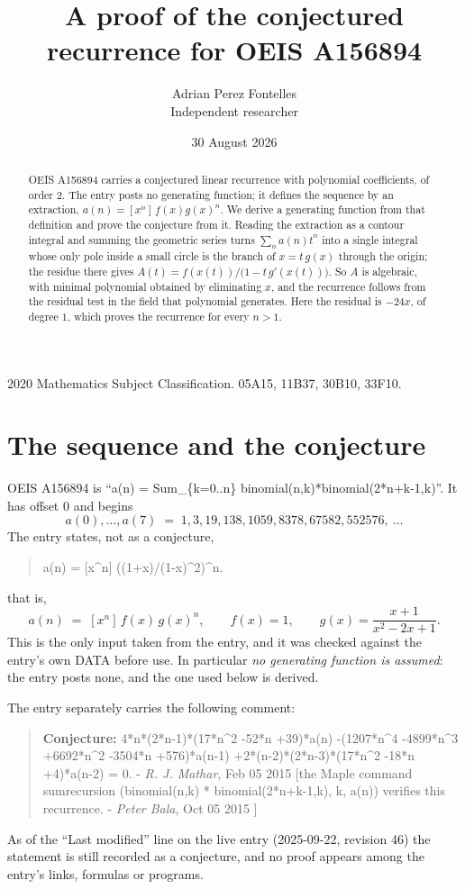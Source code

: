 \documentclass[11pt,a4paper]{article}
\title{A proof of the conjectured recurrence for OEIS A156894}
\author{Adrian Perez Fontelles\\ \small Independent researcher}
\date{30 August 2026}
\theoremstyle{plain}
\theoremstyle{definition}
\begin{document}
\maketitle

\begin{abstract}
OEIS A156894 carries a conjectured linear recurrence with polynomial coefficients, of
order 2. The entry posts no generating function; it defines the sequence by an
extraction, $a(n)=[x^{n}]\,f(x)g(x)^{n}$. We derive a generating function from that
definition and prove the conjecture from it. Reading the extraction as a contour integral
and summing the geometric series turns $\sum_{n}a(n)t^{n}$ into a single integral whose
only pole inside a small circle is the branch of $x=t\,g(x)$ through the origin; the
residue there gives $A(t)=f(x(t))/\bigl(1-t\,g'(x(t))\bigr)$. So $A$ is algebraic, with
minimal polynomial obtained by eliminating $x$, and the recurrence follows from the
residual test in the field that polynomial generates. Here the residual is
$- 24 x$, of degree $1$, which proves the recurrence for every $n>1$.
\end{abstract}

\noindent\small 2020 Mathematics Subject Classification. 05A15, 11B37, 30B10, 33F10.\normalsize

\section{The sequence and the conjecture}

OEIS A156894 is ``a(n) = Sum\_\{k=0..n\} binomial(n,k)*binomial(2*n+k-1,k)''. It has offset $0$ and begins
\[
a(0),\dots,a(7)\;=\;1, 3, 19, 138, 1059, 8378, 67582, 552576,\ \dots
\]
The entry states, not as a conjecture,
\begin{quote}\small
a(n) = [x\^{}n] ((1+x)/(1-x)\^{}2)\^{}n.
\end{quote}
that is,
\begin{equation}\label{eq:def}
a(n)\;=\;[x^{n}]\,f(x)\,g(x)^{n},
\qquad f(x)=1,\qquad g(x)=\frac{x + 1}{x^{2} - 2 x + 1} .
\end{equation}
This is the only input taken from the entry, and it was checked against the entry's own
DATA before use. In particular \emph{no generating function is assumed}: the entry posts
none, and the one used below is derived.

The entry separately carries the following comment:
\begin{quote}\small
\textbf{Conjecture:} 4*n*(2*n-1)*(17*n\^{}2 -52*n +39)*a(n) -(1207*n\^{}4 -4899*n\^{}3 +6692*n\^{}2 -3504*n +576)*a(n-1) +2*(n-2)*(2*n-3)*(17*n\^{}2 -18*n +4)*a(n-2) = 0. - \emph{R. J. Mathar}, Feb 05 2015 [the Maple command sumrecursion (binomial(n,k) * binomial(2*n+k-1,k), k, a(n)) verifies this recurrence. - \emph{Peter Bala}, Oct 05 2015 ]
\end{quote}
As of the ``Last modified'' line on the live entry (2025-09-22, revision 46) the
statement is still recorded as a conjecture, and no proof appears among the entry's links,
formulas or programs.
\end{document}
